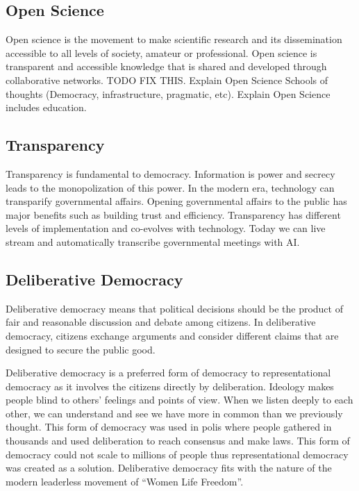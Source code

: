 \documentclass{IEEEtran}
\begin{document}
\subsection{Open Science}
Open science is the movement to make scientific research and its dissemination accessible to all levels of society, amateur or professional. Open science is transparent and accessible knowledge that is shared and developed through collaborative networks.
TODO FIX THIS. Explain Open Science Schools of thoughts (Democracy, infrastructure, pragmatic, etc). Explain Open Science includes education.





\subsection{Transparency}
Transparency is fundamental to democracy. Information is power and secrecy leads to the monopolization of this power. In the modern era, technology can transparify governmental affairs. Opening governmental affairs to the public has major benefits such as building trust and efficiency. Transparency has different levels of implementation and co-evolves with technology. Today we can live stream and automatically transcribe governmental meetings with AI. 


\subsection{Deliberative Democracy}
Deliberative democracy means that political decisions 
should be the product of fair and reasonable discussion and debate among citizens. In deliberative democracy, citizens exchange arguments and consider different claims that are designed to secure the public good. 

Deliberative democracy is a preferred form of democracy to representational democracy as it involves the citizens directly by deliberation. Ideology makes people blind to others' feelings and points of view. When we listen deeply to each other, we can understand and see we have more in common than we previously thought. This form of democracy was used in polis where people gathered in thousands and used deliberation to reach consensus and make laws. This form of democracy could not scale to millions of people thus representational democracy was created as a solution. Deliberative democracy fits with the nature of the modern leaderless movement of “Women Life Freedom”.
\end{document}
